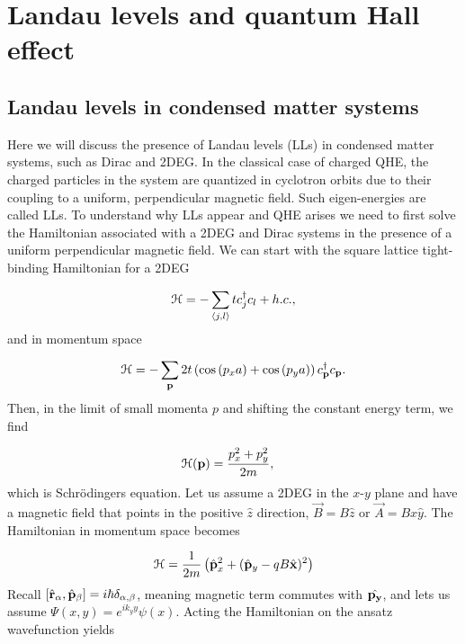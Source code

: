 \section{Landau levels and quantum Hall effect}

\subsection{Landau levels in condensed matter systems}
Here we will discuss the presence of Landau levels (LLs) in condensed matter systems, such as Dirac and 2DEG.
In the classical case of charged QHE, the charged particles in the system are quantized in cyclotron orbits due to their coupling to a uniform, perpendicular magnetic field. Such eigen-energies are called LLs.
To understand why LLs appear and QHE arises we need to first solve the Hamiltonian associated with a 2DEG and Dirac systems in the presence of a uniform perpendicular magnetic field.
We can start with the square lattice tight-binding Hamiltonian for a 2DEG

\begin{equation}
  \mathcal{H} = -\sum_{\langle j,l \rangle} tc^{\dagger}_j c_{l} + h.c.,
\end{equation}
and in momentum space

\begin{equation}
  \mathcal{H} = -\sum_{\mathbf{p}} 2t \left( \cos{(p_x a)} + \cos{(p_y a)} \right) c^{\dagger}_{\mathbf{p}} c_{\mathbf{p}}.
\end{equation}
Then, in the limit of small momenta $p$ and shifting the constant energy term, we find

\begin{align}
  \mathcal{H}(\mathbf{p}) &= \dfrac{p_x^2 + p_y^2}{2m},
\end{align}
which is Schr\"{o}dingers equation.
Let us assume a 2DEG in the $x$-$y$ plane and have a magnetic field that points in the positive $\hat{z}$ direction, $\vec{B} = B\hat{z}$ or $\vec{A} = Bx\hat{y}$.
The Hamiltonian in momentum space becomes

\begin{equation}
  \ham = \dfrac{1}{2m} \left( \op{p}_x^2 + (\op{p}_y - qB \op{x})^2 \right)
\end{equation}
Recall $[\op{r}_{\alpha}, \op{p}_{\beta}] = i\hbar \delta_{\alpha,\beta}$, meaning magnetic term commutes with $\op{p_y}$, and lets us assume $\Psi(x,y) = e^{ik_y y} \psi(x)$.
Acting the Hamiltonian on the ansatz wavefunction yields

